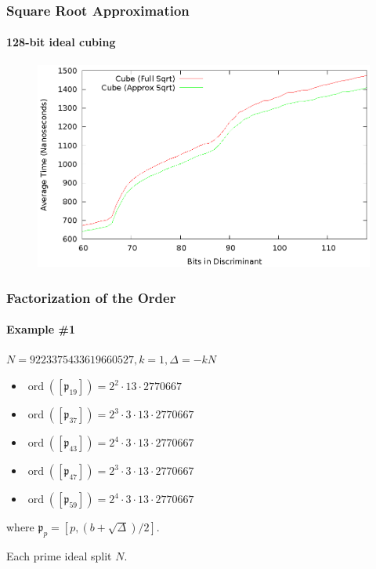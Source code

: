\documentclass{beamer}
\DeclareMathOperator{\ord}{ord}
\newcommand{\ideal}{\mathfrak}
\newcommand{\idealclass}[1]{\left[ \ideal #1 \right]}
\begin{document}
\begin{frame}
\frametitle{Square Root Approximation}
\framesubtitle{128-bit ideal cubing}
\begin{figure}
\includegraphics[scale=0.86]{cube-sqrtopt-128}
\end{figure}
\end{frame}

\begin{frame}
\frametitle{Factorization of the Order}
\framesubtitle{Example \#1}

$N = 9223375433619660527, k = 1, \Delta = -kN$
\begin{itemize}
\item $\ord(\idealclass{p_{19}}) = 2^2 \cdot 13 \cdot 2770667$
\item $\ord(\idealclass{p_{37}}) = 2^3 \cdot 3 \cdot 13 \cdot 2770667$
\item $\ord(\idealclass{p_{43}}) = 2^4 \cdot 3 \cdot 13 \cdot 2770667$
\item $\ord(\idealclass{p_{47}}) = 2^3 \cdot 3 \cdot 13 \cdot 2770667$
\item $\ord(\idealclass{p_{59}}) = 2^4 \cdot 3 \cdot 13 \cdot 2770667$
\end{itemize}

where $\ideal p_p = [p, (b + \sqrt\Delta)/2]$.

\bigskip
Each prime ideal split $N$.
\end{frame}
\end{document}
